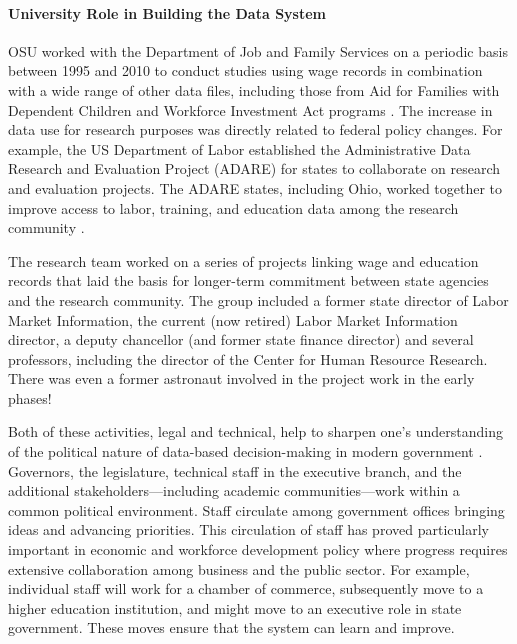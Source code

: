 \documentclass[
]{WileySix}
\begin{document}
\hypertarget{university-role-in-building-the-data-system}{%
\paragraph{University Role in Building the Data System}\label{university-role-in-building-the-data-system}}

OSU worked with the Department of Job and Family Services on a periodic basis between 1995 and 2010 to conduct studies using wage records in combination with a wide range of other data files, including those from Aid for Families with Dependent Children and Workforce Investment Act programs \citep{centerforhumanresourceresearch2001}. The increase in data use for research purposes was directly related to federal policy changes. For example, the US Department of Labor established the Administrative Data Research and Evaluation Project (ADARE) for states to collaborate on research and evaluation projects. The ADARE states, including Ohio, worked together to improve access to labor, training, and education data among the research community \citep{stevens2012}.

The research team worked on a series of projects linking wage and education records that laid the basis for longer-term commitment between state agencies and the research community. The group included a former state director of Labor Market Information, the current (now retired) Labor Market Information director, a deputy chancellor (and former state finance director) and several professors, including the director of the Center for Human Resource Research. There was even a former astronaut involved in the project work in the early phases!

Both of these activities, legal and technical, help to sharpen one's understanding of the political nature of data-based decision-making in modern government \citep{stone2012}. Governors, the legislature, technical staff in the executive branch, and the additional stakeholders---including academic communities---work within a common political environment. Staff circulate among government offices bringing ideas and advancing priorities. This circulation of staff has proved particularly important in economic and workforce development policy where progress requires extensive collaboration among business and the public sector. For example, individual staff will work for a chamber of commerce, subsequently move to a higher education institution, and might move to an executive role in state government. These moves ensure that the system can learn and improve.
\end{document}
